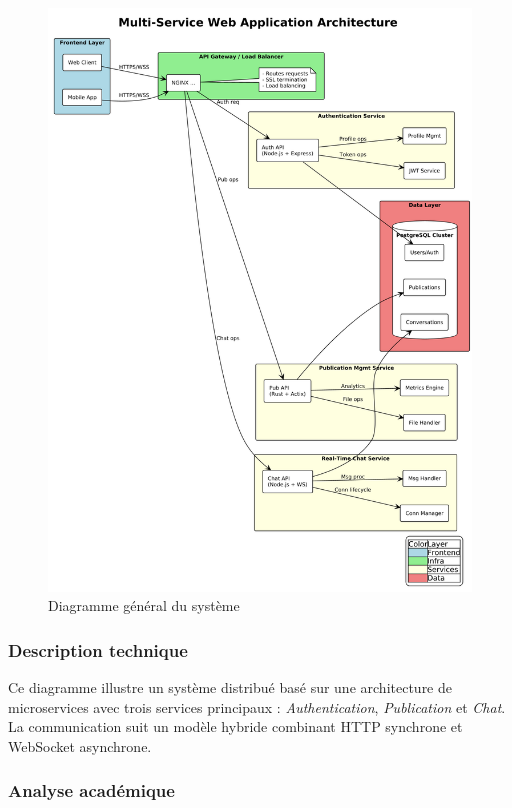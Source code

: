 \documentclass[12pt]{rapportPfe}
\begin{document}
\begin{figure}[htbp]
    \centering
    \includegraphics[width=1.0\textwidth]{diagrams/diagram.png}
    \caption{Diagramme général du système}
    \label{fig:diagram-general}
\end{figure}

\subsubsection*{Description technique}

Ce diagramme illustre un système distribué basé sur une architecture de microservices avec trois services principaux : \textit{Authentication}, \textit{Publication} et \textit{Chat}. La communication suit un modèle hybride combinant HTTP synchrone et WebSocket asynchrone.

\subsubsection*{Analyse académique}
\end{document}
